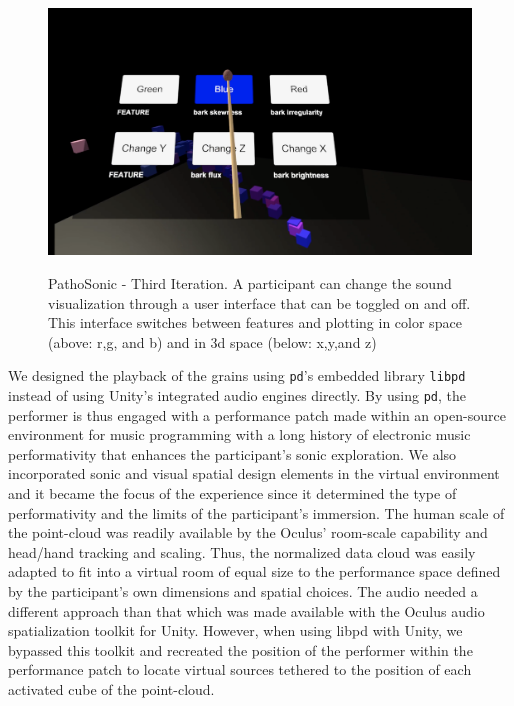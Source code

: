 \documentclass{nime-alternate}
\begin{document}
\begin{figure}[htbp]
       \centering
              \includegraphics[width=1\textwidth]{pathosonic3.jpg}
       \label{PathoSonic - Third Iteration. A participant can change the sound visualization through a user interface that can be toggled on and off. This interface switches between features and plotting in color space (above: r,g, and b) and in 3d space (below: x,y,and z)}
       \caption{PathoSonic - Third Iteration. A participant can change the sound visualization through a user interface that can be toggled on and off. This interface switches between features and plotting in color space (above: r,g, and b) and in 3d space (below: x,y,and z)}
\end{figure}

We designed the playback of the grains using \texttt{pd}’s embedded library \texttt{libpd} instead of using Unity’s integrated audio engines directly. By using \texttt{pd}, the performer is thus engaged with a performance patch made within an open-source environment for music programming with a long history of electronic music performativity that enhances the participant’s sonic exploration. We also incorporated sonic and visual spatial design elements in the virtual environment and it became the focus of the experience since it determined the type of performativity and the limits of the participant’s immersion. The human scale of the point-cloud was readily available by the Oculus’ room-scale capability and head/hand tracking and scaling. Thus, the normalized data cloud was easily adapted to fit into a virtual room of equal size to the performance space defined by the participant's own dimensions and spatial choices. The audio needed a different approach than that which was made available with the Oculus audio spatialization toolkit for Unity. However, when using libpd with Unity, we bypassed this toolkit and recreated the position of the performer within the performance patch to locate virtual sources tethered to the position of each activated cube of the point-cloud. 
\end{document}
